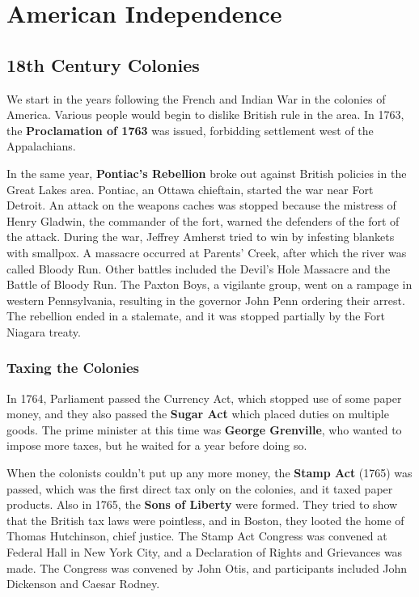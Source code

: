 \chapter{American Independence}

\section{18th Century Colonies}

We start in the years following the French and Indian War in the colonies of America.
Various people would begin to dislike British rule in the area.
In 1763, the \textbf{Proclamation of 1763} was issued, forbidding settlement west of the Appalachians.

In the same year, \textbf{Pontiac's Rebellion} broke out against British policies in the Great Lakes area.
Pontiac, an Ottawa chieftain, started the war near Fort Detroit.
An attack on the weapons caches was stopped because the mistress of Henry Gladwin, the commander of the fort,
warned the defenders of the fort of the attack.
During the war, Jeffrey Amherst tried to win by infesting blankets with smallpox.
A massacre occurred at Parents' Creek, after which the river was called Bloody Run.
Other battles included the Devil's Hole Massacre and the Battle of Bloody Run.
The Paxton Boys, a vigilante group, went on a rampage in western Pennsylvania,
resulting in the governor John Penn ordering their arrest.
The rebellion ended in a stalemate, and it was stopped partially by the Fort Niagara treaty.

\subsection*{Taxing the Colonies}

In 1764, Parliament passed the Currency Act, which stopped use of some paper money,
and they also passed the \textbf{Sugar Act} which placed duties on multiple goods.
The prime minister at this time was \textbf{George Grenville}, who wanted to impose more taxes,
but he waited for a year before doing so.

When the colonists couldn't put up any more money, the \textbf{Stamp Act} (1765) was passed,
which was the first direct tax only on the colonies, and it taxed paper products.
Also in 1765, the \textbf{Sons of Liberty} were formed.
They tried to show that the British tax laws were pointless,
and in Boston, they looted the home of Thomas Hutchinson, chief justice.
The Stamp Act Congress was convened at Federal Hall in New York City,
and a Declaration of Rights and Grievances was made.
The Congress was convened by John Otis, and participants included John Dickenson and Caesar Rodney.

